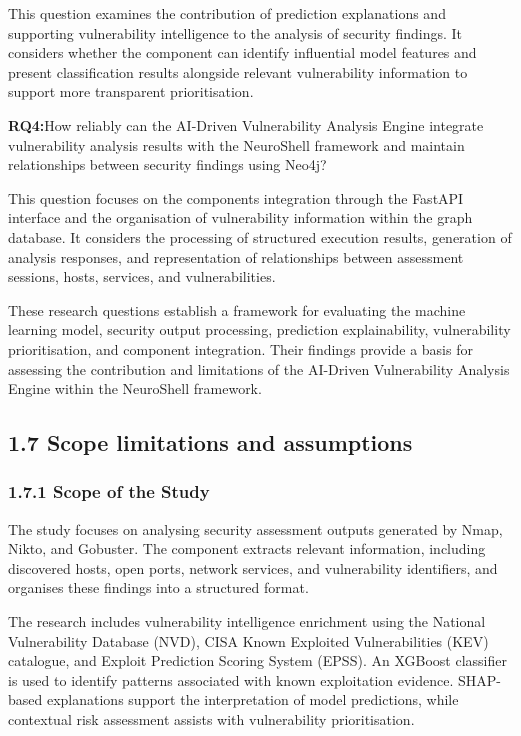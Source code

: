 \documentclass[
]{article}
\begin{document}
This question examines the contribution of prediction explanations and
supporting vulnerability intelligence to the analysis of security
findings. It considers whether the component can identify influential
model features and present classification results alongside relevant
vulnerability information to support more transparent prioritisation.

\textbf{RQ4:}How reliably can the AI-Driven Vulnerability Analysis
Engine integrate vulnerability analysis results with the NeuroShell
framework and maintain relationships between security findings using
Neo4j?

This question focuses on the component\textquotesingle s integration
through the FastAPI interface and the organisation of vulnerability
information within the graph database. It considers the processing of
structured execution results, generation of analysis responses, and
representation of relationships between assessment sessions, hosts,
services, and vulnerabilities.

These research questions establish a framework for evaluating the
machine learning model, security output processing, prediction
explainability, vulnerability prioritisation, and component integration.
Their findings provide a basis for assessing the contribution and
limitations of the AI-Driven Vulnerability Analysis Engine within the
NeuroShell framework.

\hypertarget{scope-limitations-and-assumptions}{%
\subsection{1.7 Scope limitations and
assumptions}\label{scope-limitations-and-assumptions}}

\hypertarget{scope-of-the-study}{%
\subsubsection{1.7.1 Scope of the Study}\label{scope-of-the-study}}

The study focuses on analysing security assessment outputs generated by
Nmap, Nikto, and Gobuster. The component extracts relevant information,
including discovered hosts, open ports, network services, and
vulnerability identifiers, and organises these findings into a
structured format.

The research includes vulnerability intelligence enrichment using the
National Vulnerability Database (NVD), CISA Known Exploited
Vulnerabilities (KEV) catalogue, and Exploit Prediction Scoring System
(EPSS). An XGBoost classifier is used to identify patterns associated
with known exploitation evidence. SHAP-based explanations support the
interpretation of model predictions, while contextual risk assessment
assists with vulnerability prioritisation.
\end{document}
